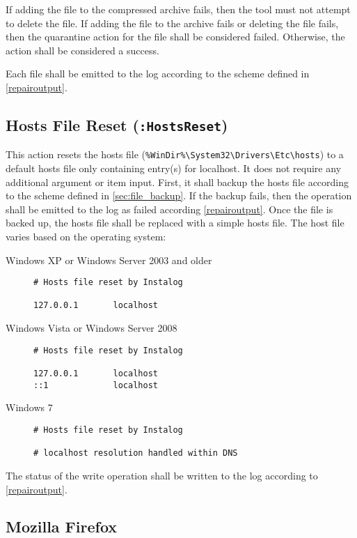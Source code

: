 If adding the file to the compressed archive fails, then the tool must not
attempt to delete the file.  If adding the file to the archive fails or deleting
the file fails, then the quarantine action for the file shall be considered
failed.  Otherwise, the action shall be considered a success.  

Each file shall be emitted to the log according to the scheme defined in
\ref{repairoutput}.

\subsection{Hosts File Reset (\texttt{:HostsReset})}
This action resets the hosts file (\verb|%WinDir%\System32\Drivers\Etc\hosts|)
to a default hosts file only containing entry(s) for localhost.  It does not
require any additional argument or item input. First, it shall backup the hosts
file according to the scheme defined in \ref{sec:file_backup}.  If the backup
fails, then the operation shall be emitted to the log as failed according
\ref{repairoutput}. Once the file is backed up, the hosts file shall be replaced
with a simple hosts file.  The host file varies based on the operating system:

\begin{description}
\item[Windows XP or Windows Server 2003 and older] \hfill 
\begin{verbatim}
# Hosts file reset by Instalog

127.0.0.1       localhost
\end{verbatim}
\item[Windows Vista or Windows Server 2008] \hfill 
\begin{verbatim}
# Hosts file reset by Instalog

127.0.0.1       localhost
::1             localhost
\end{verbatim}
\item[Windows 7] \hfill 
\begin{verbatim}
# Hosts file reset by Instalog

# localhost resolution handled within DNS
\end{verbatim}
\end{description}

The status of the write operation shall be written to the log according to
\ref{repairoutput}.  

\subsection{Mozilla Firefox}

